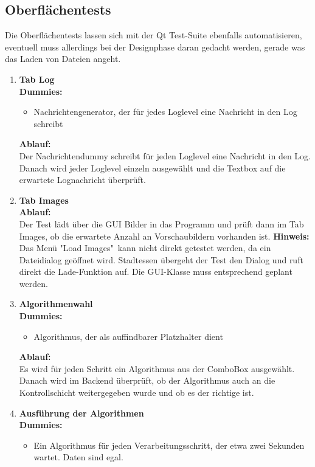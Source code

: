 \subsection{Oberflächentests}
Die Oberflächentests lassen sich mit der Qt Test-Suite ebenfalls automatisieren, eventuell muss allerdings bei der Designphase daran gedacht werden, gerade was das Laden von Dateien angeht.
\begin{enumerate}[align=left, leftmargin=4em, label={\textbf{\textbackslash T3.\arabic*0\textbackslash}} ]
	\item \textbf{Tab Log}\\
	\subitem\textbf{Dummies:} \begin{itemize}
		\item Nachrichtengenerator, der für jedes Loglevel eine Nachricht in den Log schreibt
	\end{itemize}
	\subitem\textbf{Ablauf:}\\ Der Nachrichtendummy schreibt für jeden Loglevel eine Nachricht in den Log. Danach wird jeder Loglevel einzeln ausgewählt und die Textbox auf die erwartete Lognachricht überprüft.
	\item \textbf{Tab Images}\\
	\subitem \textbf{Ablauf:}\\ Der Test lädt über die GUI Bilder in das Programm und prüft dann im Tab Images, ob die erwartete Anzahl an Vorschaubildern vorhanden ist.
	\subitem \textbf{Hinweis:}\\
	Das Menü "{}Load Images" kann nicht direkt getestet werden, da ein Dateidialog geöffnet wird. Stadtessen übergeht der Test den Dialog und ruft direkt die Lade-Funktion auf. Die GUI-Klasse muss entsprechend geplant werden.
	\item \textbf{Algorithmenwahl}\\
	\subitem \textbf{Dummies:}\begin{itemize}
		\item Algorithmus, der als auffindbarer Platzhalter dient
	\end{itemize}
	\subitem \textbf{Ablauf:}\\ Es wird für jeden Schritt ein Algorithmus aus der ComboBox ausgewählt. Danach wird im Backend überprüft, ob der Algorithmus auch an die Kontrollschicht weitergegeben wurde und ob es der richtige ist.
	\item \textbf{Ausführung der Algorithmen}\\
	\subitem \textbf{Dummies:}\begin{itemize}
		\item Ein Algorithmus für jeden Verarbeitungsschritt, der etwa zwei Sekunden wartet. Daten sind egal.

\end{itemize}
\end{enumerate}

